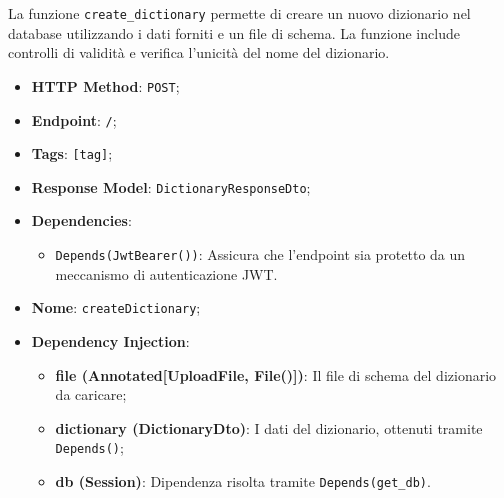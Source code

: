 \par La funzione \texttt{create\_dictionary} permette di creare un nuovo dizionario nel database utilizzando i dati forniti e un file di schema. La funzione include controlli di validità e verifica l'unicità del nome del dizionario.

\begin{itemize}
\item \textbf{HTTP Method}: \texttt{POST};
\item \textbf{Endpoint}: \texttt{/};
\item \textbf{Tags}: \texttt{[tag]};
\item \textbf{Response Model}: \texttt{DictionaryResponseDto};
\item \textbf{Dependencies}:
\begin{itemize}
\item \texttt{Depends(JwtBearer())}: Assicura che l'endpoint sia protetto da un meccanismo di autenticazione JWT.
\end{itemize}
\item \textbf{Nome}: \texttt{createDictionary};
\item \textbf{Dependency Injection}:
\begin{itemize}
\item \textbf{file (Annotated[UploadFile, File()])}: Il file di schema del dizionario da caricare;
\item \textbf{dictionary (DictionaryDto)}: I dati del dizionario, ottenuti tramite \texttt{Depends()};
\item \textbf{db (Session)}: Dipendenza risolta tramite \texttt{Depends(get\_db)}.
\end{itemize}
\end{itemize}

